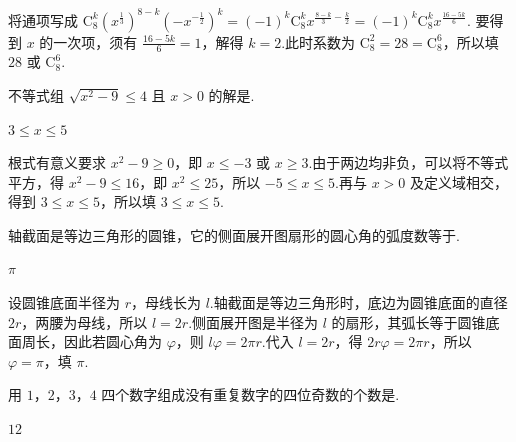 \begin{solution}
将通项写成
\(\mathrm C_8^k\left(x^{\frac{1}{3}}\right)^{8-k}\left(-x^{-\frac{1}{2}}\right)^k=(-1)^k\mathrm C_8^k x^{\frac{8-k}{3}-\frac{k}{2}}=(-1)^k\mathrm C_8^k x^{\frac{16-5k}{6}}\).
要得到 \(x\) 的一次项，须有 \(\frac{16-5k}{6}=1\)，解得 \(k=2\).此时系数为
\(\mathrm C_8^2=28=\mathrm C_8^6\)，所以填 \(28\) 或 \(\mathrm C_8^6\).
\end{solution}

\begin{problem}

不等式组 \(\sqrt{x^2-9}\leqslant 4\) 且 \(x>0\) 的解是\fillinblank{}.
\end{problem}

\begin{answer}
\(3\leqslant x\leqslant 5\)
\end{answer}

\begin{solution}
根式有意义要求 \(x^2-9\geqslant0\)，即 \(x\leqslant-3\) 或 \(x\geqslant3\).由于两边均非负，可以将不等式平方，得
\(x^2-9\leqslant16\)，即 \(x^2\leqslant25\)，所以 \(-5\leqslant x\leqslant5\).再与 \(x>0\) 及定义域相交，得到
\(3\leqslant x\leqslant5\)，所以填 \(3\leqslant x\leqslant5\).
\end{solution}

\begin{problem}

轴截面是等边三角形的圆锥，它的侧面展开图扇形的圆心角的弧度数等于\fillinblank{}.
\end{problem}

\begin{answer}
\(\pi\)
\end{answer}

\begin{solution}
设圆锥底面半径为 \(r\)，母线长为 \(l\).轴截面是等边三角形时，底边为圆锥底面的直径 \(2r\)，两腰为母线，所以 \(l=2r\).侧面展开图是半径为 \(l\) 的扇形，其弧长等于圆锥底面周长，因此若圆心角为 \(\varphi\)，则
\(l\varphi=2\pi r\).代入 \(l=2r\)，得 \(2r\varphi=2\pi r\)，所以 \(\varphi=\pi\)，填 \(\pi\).
\end{solution}

\begin{problem}

用 \(1\)，\(2\)，\(3\)，\(4\) 四个数字组成没有重复数字的四位奇数的个数是\fillinblank{}.
\end{problem}

\begin{answer}
\(12\)
\end{answer}

